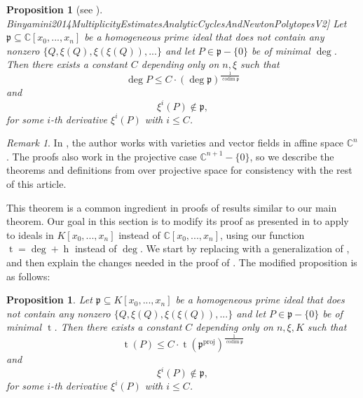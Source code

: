 \documentclass[reqno]{amsart}
\newcommand{\mycite}[2]{\cite[#1]{#2}}
\theoremstyle{plain}
\newtheorem{PropThm}[Thm]{Proposition}
\newtheorem{Prop}[Cor]{Proposition}
\theoremstyle{definition}
\theoremstyle{remark}
\newtheorem{Rem}[Cor]{Remark}
\theoremstyle{plain}
\begin{document}
\begin{Prop}[see \mycite{Lemmas 12 and 13}{Binyamini2014MultiplicityEstimatesAnalyticCyclesAndNewtonPolytopesV2}]
Let $\mathfrak p\subseteq\mathbb C[x_0,...,x_n]$ be a homogeneous prime ideal that does not contain any nonzero $\{Q,\xi(Q),\xi(\xi(Q)),...\}$ and let $P\in\mathfrak p-\{0\}$ be of minimal $\deg$. Then there exists a constant $C$ depending only on $n,\xi$ such that
\[
    \deg P
        \leq
    C\cdot(\deg\mathfrak p)^{\frac1{\operatorname{codim}\mathfrak p}}
\]
and
\[
    \xi^i(P)\not\in\mathfrak p
,\]
for some $i$-th derivative $\xi^i(P)$ with $i\leq C$.
\end{Prop}

\begin{Rem}
In \cite{Binyamini2014MultiplicityEstimatesAnalyticCyclesAndNewtonPolytopesV2}, the author works with varieties and vector fields in affine space $\mathbb C^n$. The proofs also work in the projective case $\mathbb C^{n+1}-\{0\}$, so we describe the theorems and definitions from \cite{Binyamini2014MultiplicityEstimatesAnalyticCyclesAndNewtonPolytopesV2} over projective space for consistency with the rest of this article.
\end{Rem}

This theorem is a common ingredient in proofs of results similar to our main theorem. Our goal in this section is to modify its proof as presented in \cite{Binyamini2014MultiplicityEstimatesAnalyticCyclesAndNewtonPolytopesV2} to apply to ideals in $K[x_0,...,x_n]$ instead of $\mathbb C[x_0,...,x_n]$, using our function $\operatorname{t}=\deg+\operatorname{h}$ instead of $\deg$. We start by replacing \cite[Lemma 12]{Binyamini2014MultiplicityEstimatesAnalyticCyclesAndNewtonPolytopesV2} with a generalization of \cite[Corollary 3]{Nesterenko1985EstimatesForTheCharacteristicFunctionOfAPrimeIdeal}, and then explain the changes needed in the proof of \cite[Lemma 13]{Binyamini2014MultiplicityEstimatesAnalyticCyclesAndNewtonPolytopesV2}. The modified proposition is as follows:

\begin{PropThm}\label{Proposition existence of polynomial of small t and small mult in ideal}
Let $\mathfrak p\subseteq K[x_0,...,x_n]$ be a homogeneous prime ideal that does not contain any nonzero $\{Q,\xi(Q),\xi(\xi(Q)),...\}$ and let $P\in\mathfrak p-\{0\}$ be of minimal $\operatorname{t}$. Then there exists a constant $C$ depending only on $n,\xi,K$ such that
\[
    \operatorname{t}(P)
        \leq
    C\cdot\operatorname{t}(\mathfrak p^\mathrm{proj})^{\frac1{\operatorname{codim}\mathfrak p}}
\]
and
\[
    \xi^i(P)\not\in\mathfrak p
,\]
for some $i$-th derivative $\xi^i(P)$ with $i\leq C$.
\end{PropThm}
\end{document}
